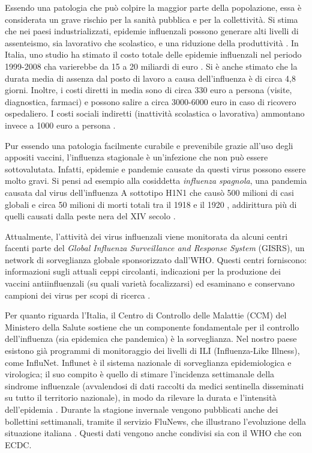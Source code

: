 Essendo una patologia che può colpire la maggior parte della popolazione, essa è considerata
un grave rischio per la sanità pubblica e per la collettività. Si stima che nei paesi industrializzati,
epidemie influenzali possono generare alti livelli di assenteismo, sia lavorativo che scolastico,
e una riduzione della produttività \cite{whoinfluenza_keyfacts}.
In Italia, uno studio ha stimato il costo totale delle epidemie influenzali nel periodo 1999-2008
cha varierebbe da 15 a 20 miliardi di euro \cite{PLLai2011}. Si è anche stimato che la durata media 
di assenza dal posto di lavoro a causa dell'influenza è di circa 4,8 giorni. 
Inoltre, i costi diretti in media sono di circa 330 euro a persona (visite, diagnostica, farmaci) e possono salire a circa 
3000-6000 euro in caso di ricovero ospedaliero.
I costi sociali indiretti (inattività scolastica o lavorativa) ammontano invece a 1000 euro a persona \cite{Sessa2005}.
\bigskip

Pur essendo una patologia facilmente curabile e prevenibile grazie all'uso degli appositi vaccini, 
l'influenza stagionale è un'infezione che non può essere sottovalutata. Infatti, epidemie e pandemie causate
da questi virus possono essere molto gravi. Si pensi ad esempio alla cosiddetta \textit{influenza spagnola},
una pandemia causata dal virus dell'influenza A sottotipo H1N1 che causò 500 milioni di casi globali e
circa 50 milioni di morti totali tra il 1918 e il 1920 \cite{taubenberger20061918}, addirittura più di quelli
causati dalla peste nera del XIV secolo \cite{JAM:JAM1492}.
\bigskip

Attualmente, l'attività dei virus influenzali viene monitorata da alcuni centri facenti
parte del \textit{Global Influenza Surveillance and Response System} (GISRS), un network di sorveglianza globale
sponsorizzato dall'WHO. Questi centri forniscono: informazioni sugli attuali ceppi circolanti, indicazioni
per la produzione dei vaccini antiinfluenzali (su quali varietà focalizzarsi) ed esaminano e conservano
campioni dei virus per scopi di ricerca \cite{whoinfluenza_surveillance}.
\bigskip

Per quanto riguarda l'Italia, il Centro di Controllo delle Malattie (CCM) del Ministero della Salute sostiene
che un componente fondamentale per il controllo dell'influenza (sia epidemica che pandemica) è la sorveglianza.
Nel nostro paese esistono già programmi di monitoraggio dei livelli di ILI (Influenza-Like Illness), come 
InfluNet. Influnet è il sistema nazionale di sorveglianza epidemiologica e virologica; il suo compito è quello di
stimare l'incidenza settimanale della sindrome influenzale (avvalendosi di dati raccolti da medici sentinella disseminati
su tutto il territorio nazionale), in modo da rilevare la durata e l'intensità dell'epidemia \cite{influnet}. Durante la 
stagione invernale vengono pubblicati anche dei bollettini settimanali, tramite il servizio FluNews, che illustrano 
l'evoluzione della situazione italiana \cite{influnet_bollettini}. Questi dati vengono anche condivisi sia con il WHO che con 
ECDC.
\bigskip

